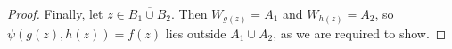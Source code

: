 \documentclass{article}
\begin{document}
\begin{enumerate}[label={\bf Q\arabic*:}]
\begin{proof}
      Finally, let $z\in\overline{B_1\cup B_2}$. Then $W_{g(z)}=A_1$ and
      $W_{h(z)}=A_2$, so $\psi(g(z),h(z))=f(z)$ lies outside
      $A_1\cup A_2$, as we are required to show.







    \end{proof}
\end{enumerate}
\end{document}
